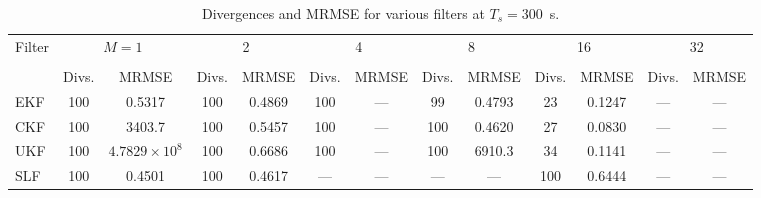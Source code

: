 \documentclass[../zhang_thesis.tex]{subfiles}
\begin{document}
\begin{sidewaystable}
\caption{Divergences and MRMSE for various filters at $T_s=300$~s.}
\centering
\begin{tabular}{l*{12}{c}}
\toprule
Filter & \multicolumn{2}{c}{$M=1$} & \multicolumn{2}{c}{2} & \multicolumn{2}{c}{4} & \multicolumn{2}{c}{8} & \multicolumn{2}{c}{16} & \multicolumn{2}{c}{32} \\
\cmidrule(r){2-3} \cmidrule(lr){4-5} \cmidrule(lr){6-7} \cmidrule(lr){8-9} \cmidrule(lr){10-11} \cmidrule(lr){12-13} \\
& Divs. & MRMSE & Divs. & MRMSE & Divs. & MRMSE & Divs. & MRMSE & Divs. & MRMSE & Divs. & MRMSE \\
\midrule
EKF & 100 & 0.5317                & 100 & 0.4869 & 100 & --- &  99 & 0.4793 & 23 & 0.1247 & --- & --- \\
CKF & 100 & 3403.7                & 100 & 0.5457 & 100 & --- & 100 & 0.4620 & 27 & 0.0830 & --- & --- \\
UKF & 100 & $4.7829\times 10^{8}$ & 100 & 0.6686 & 100 & --- & 100 & 6910.3 & 34 & 0.1141 & --- & --- \\
SLF & 100 & 0.4501                & 100 & 0.4617 & --- & --- & --- & ---   & 100 & 0.6444 & --- & --- \\
\bottomrule
\end{tabular}
\end{sidewaystable}
\end{document}
